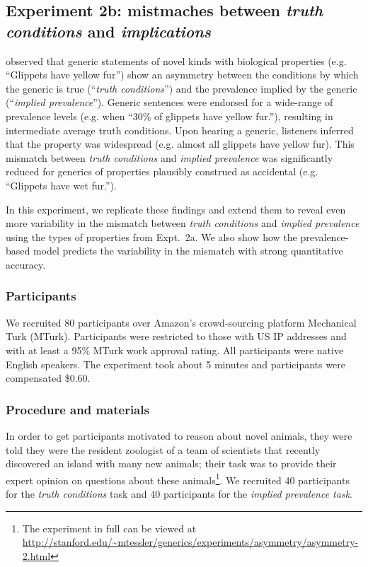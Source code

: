 \documentclass[10pt,letterpaper]{article}
\begin{document}
\subsection{Experiment 2b: mistmaches between \emph{truth conditions} and \emph{implications}}

\citeauthor{Cimpian2010} observed that generic statements of novel kinds with biological properties (e.g. ``Glippets have yellow fur'') show an asymmetry between the conditions by which the generic is true (``\emph{truth conditions}'') and the prevalence implied by the generic (``\emph{implied prevalence}''). 
Generic sentences were endorsed for a wide-range of prevalence levels (e.g. when ``30\% of glippets have yellow fur.''), resulting in intermediate average truth conditions. 
Upon hearing a generic, listeners inferred that the property was widespread (e.g. almost all glippets have yellow fur).
This mismatch between \emph{truth conditions} and \emph{implied prevalence} was significantly reduced for generics of properties plausibly construed as accidental (e.g. ``Glippets have wet fur.'').

In this experiment,  we replicate these findings and extend them to reveal even more variability in the mismatch between \emph{truth conditions} and \emph{implied prevalence} using the types of properties from Expt.~2a.
We also show how the prevalence-based model predicts the variability in the mismatch with strong quantitative accuracy.


\subsubsection{Participants}

We recruited 80 participants over Amazon's crowd-sourcing platform Mechanical Turk (MTurk).  
Participants were restricted to those with US IP addresses and with at least a 95\% MTurk work approval rating. 
All participants were native English speakers. 
The experiment took about 5 minutes and participants were compensated \$0.60.

\subsubsection{Procedure and materials}

In order to get participants motivated to reason about novel animals, they were told they were the resident zoologist of a team of scientists that recently discovered an island with many new animals; their task was to provide their expert opinion on questions about these animals\footnote{The experiment in full can be viewed at \url{http://stanford.edu/~mtessler/generics/experiments/asymmetry/asymmetry-2.html}}. 
We recruited 40 participants for the \emph{truth conditions} task and 40 participants for the \emph{implied prevalence task}. 
\end{document}
